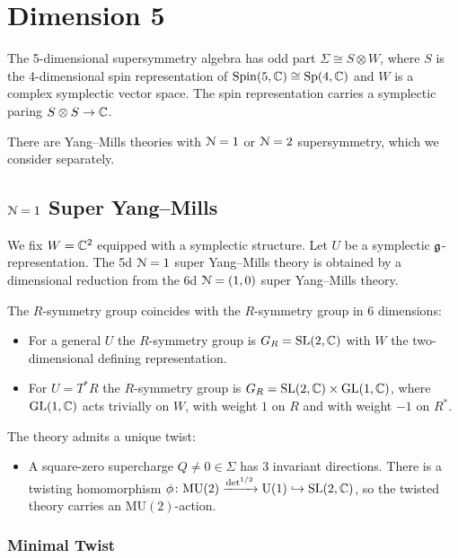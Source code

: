 \documentclass[10pt, oneside]{article}
\newcommand{\MU}{\mathrm{MU}}
\renewcommand{\U}{\mathrm{U}}
\begin{document}
\section{Dimension 5}

The 5-dimensional supersymmetry algebra has odd part $\Sigma\cong S\otimes W$, where $S$ is the 4-dimensional spin representation of $\mathrm{Spin}(5, \mathbb C)\cong \mathrm{Sp}(4, \mathbb C)$ and $W$ is a complex symplectic vector space. The spin representation carries a symplectic paring $S\otimes S\rightarrow \mathbb C$.

There are Yang--Mills theories with $\mathcal N=1$ or $\mathcal N=2$ supersymmetry, which we consider separately.

\subsection{\texorpdfstring{$\mathcal{N} = 1$}{N=1} Super Yang--Mills}
\label{5d_1_section}

We fix $W = \mathbb C^2$ equipped with a symplectic structure. Let $U$ be a symplectic $\mathfrak g$-representation. The 5d $\mathcal N=1$ super Yang--Mills theory is obtained by a dimensional reduction from the 6d $\mathcal N=(1, 0)$ super Yang--Mills theory.

The $R$-symmetry group coincides with the $R$-symmetry group in 6 dimensions:
\begin{itemize}
\item For a general $U$ the $R$-symmetry group is $G_R=\mathrm{SL}(2, \mathbb C)$ with $W$ the two-dimensional defining representation.

\item For $U=T^* R$ the $R$-symmetry group is $G_R=\mathrm{SL}(2, \mathbb C)\times \mathrm{GL}(1, \mathbb C)$, where $\mathrm{GL}(1, \mathbb C)$ acts trivially on $W$, with weight $1$ on $R$ and with weight $-1$ on $R^*$.
\end{itemize}

The theory admits a unique twist:
\begin{itemize}
\item A square-zero supercharge $Q\neq 0\in\Sigma$ has 3 invariant directions. There is a twisting homomorphism $\phi\colon \MU(2)\xrightarrow{\det^{1/2}}\U(1)\hookrightarrow \SL(2, \CC)$, so the twisted theory carries an $\MU(2)$-action.
\end{itemize}

\subsubsection{Minimal Twist}
\label{sect:5d1minimaltwist}
\end{document}
